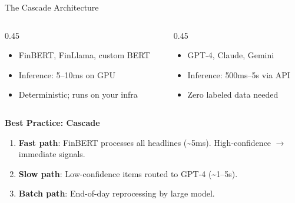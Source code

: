 \documentclass[aspectratio=169]{beamer}
\begin{document}
\begin{frame}[shrink=10]{The Cascade Architecture}
\begin{center}
\end{center}
\vspace{0.1cm}
\begin{columns}[T]
\begin{column}{0.45\textwidth}
\begin{shadedbox}[title=\textbf{Fine-Tuned Small Model}]
\begin{itemize}\footnotesize
  \item FinBERT, FinLlama, custom BERT
  \item Inference: \alert{5--10ms} on GPU
  \item Deterministic; runs on your infra
\end{itemize}
\end{shadedbox}
\end{column}
\begin{column}{0.45\textwidth}
\begin{shadedbox}[title=\textbf{General-Purpose LLM}]
\begin{itemize}\footnotesize
  \item GPT-4, Claude, Gemini
  \item Inference: \alert{500ms--5s} via API
  \item Zero labeled data needed
\end{itemize}
\end{shadedbox}
\end{column}
\end{columns}
\vspace{0.2cm}
\textbf{Best Practice: Cascade}
\begin{enumerate}\footnotesize
  \item \textbf{Fast path}: FinBERT processes all headlines (\textasciitilde5ms). High-confidence $\rightarrow$ immediate signals.
  \item \textbf{Slow path}: Low-confidence items routed to GPT-4 (\textasciitilde1--5s).
  \item \textbf{Batch path}: End-of-day reprocessing by large model.
\end{enumerate}
\end{frame}
\end{document}
